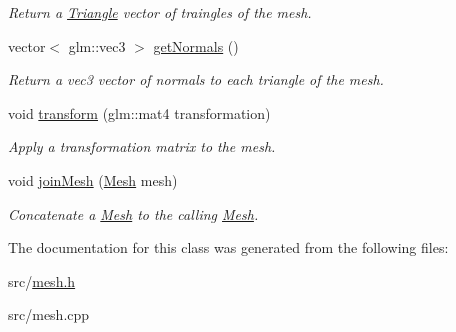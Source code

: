 \begin{DoxyCompactItemize}
\begin{DoxyCompactList}\small\item\em Return a \hyperlink{classTriangle}{Triangle} vector of traingles of the mesh. \end{DoxyCompactList}\item 
vector$<$ glm\+::vec3 $>$ \hyperlink{classMesh_a1da11111fe8808032a1ba756b20a4c24}{get\+Normals} ()\hypertarget{classMesh_a1da11111fe8808032a1ba756b20a4c24}{}\label{classMesh_a1da11111fe8808032a1ba756b20a4c24}

\begin{DoxyCompactList}\small\item\em Return a vec3 vector of normals to each triangle of the mesh. \end{DoxyCompactList}\item 
void \hyperlink{classMesh_acbeadf3e6e460863e9804f1950c41315}{transform} (glm\+::mat4 transformation)\hypertarget{classMesh_acbeadf3e6e460863e9804f1950c41315}{}\label{classMesh_acbeadf3e6e460863e9804f1950c41315}

\begin{DoxyCompactList}\small\item\em Apply a transformation matrix to the mesh. \end{DoxyCompactList}\item 
void \hyperlink{classMesh_afe813142fb85a732f95b127ab313d5c7}{join\+Mesh} (\hyperlink{classMesh}{Mesh} mesh)\hypertarget{classMesh_afe813142fb85a732f95b127ab313d5c7}{}\label{classMesh_afe813142fb85a732f95b127ab313d5c7}

\begin{DoxyCompactList}\small\item\em Concatenate a \hyperlink{classMesh}{Mesh} to the calling \hyperlink{classMesh}{Mesh}. \end{DoxyCompactList}\end{DoxyCompactItemize}


The documentation for this class was generated from the following files\+:\begin{DoxyCompactItemize}
\item 
src/\hyperlink{mesh_8h}{mesh.\+h}\item 
src/mesh.\+cpp\end{DoxyCompactItemize}
